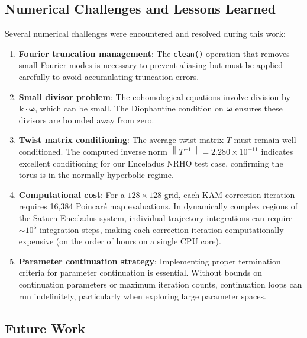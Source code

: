 \documentclass[review,onefignum,onetabnum]{siamart220329}
\newcommand{\norm}[1]{\left\|#1\right\|}
\begin{document}
\subsection{Numerical Challenges and Lessons Learned}

Several numerical challenges were encountered and resolved during this work:

\begin{enumerate}
    \item \textbf{Fourier truncation management}: The \texttt{clean()} operation
          that removes small Fourier modes is necessary to prevent aliasing but
          must be applied carefully to avoid accumulating truncation errors.

    \item \textbf{Small divisor problem}: The cohomological equations involve
          division by $\mathbf{k} \cdot \boldsymbol{\omega}$, which can be small.
          The Diophantine condition on $\boldsymbol{\omega}$ ensures these divisors
          are bounded away from zero.

    \item \textbf{Twist matrix conditioning}: The average twist matrix
          $\bar{T}$ must remain well-conditioned. The computed inverse norm
          $\norm{T^{-1}} = 2.280 \times 10^{-11}$ indicates excellent conditioning
          for our Enceladus NRHO test case, confirming the torus is in the
          normally hyperbolic regime.

    \item \textbf{Computational cost}: For a $128 \times 128$ grid, each
          KAM correction iteration requires 16,384 Poincaré map evaluations.
          In dynamically complex regions of the Saturn-Enceladus system, individual
          trajectory integrations can require $\sim 10^5$ integration steps,
          making each correction iteration computationally expensive (on the
          order of hours on a single CPU core).

    \item \textbf{Parameter continuation strategy}: Implementing proper termination
          criteria for parameter continuation is essential. Without bounds on
          continuation parameters or maximum iteration counts, continuation loops
          can run indefinitely, particularly when exploring large parameter spaces.
\end{enumerate}

\subsection{Future Work}
\end{document}
